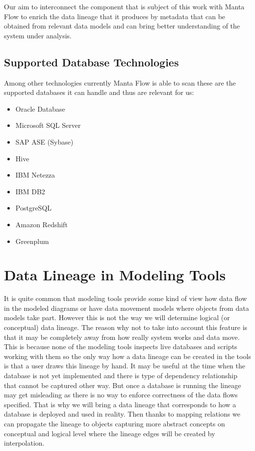Our aim to interconnect the component that is subject of this work with Manta Flow to enrich the data lineage that it produces by metadata that can be obtained from relevant data models and can bring better understanding of the system under analysis.

\subsection{Supported Database Technologies}
Among other technologies currently Manta Flow is able to scan these are the supported databases it can handle and thus are relevant for us:
\begin{itemize}
	\item Oracle Database
	\item Microsoft SQL Server
	\item SAP ASE (Sybase)
	\item Hive
	\item IBM Netezza
	\item IBM DB2
	\item PostgreSQL
	\item Amazon Redshift
	\item Greenplum
\end{itemize}

\section{Data Lineage in Modeling Tools}

It is quite common that modeling tools provide some kind of view how data flow in the modeled diagrams or have data movement models where objects from data models take part. 
However this is not the way we will determine logical (or conceptual) data lineage.
The reason why not to take into account this feature is that it may be completely away from how really system works and data move. This is because none of the modeling tools inspects live databases and scripts working with them so the only way how a data lineage can be created in the tools is that a user draws this lineage by hand. 
It may be useful at the time when the database is not yet implemented and there is type of dependency relationship that cannot be captured other way. But once a database is running the lineage may get misleading as there is no way to enforce correctness of the data flows specified.
That is why we will bring a data lineage that corresponds to how a database is deployed and used in reality. Then thanks to mapping relations we can propagate the lineage to objects capturing more abstract concepts on conceptual and logical level where the lineage edges will be created by interpolation.